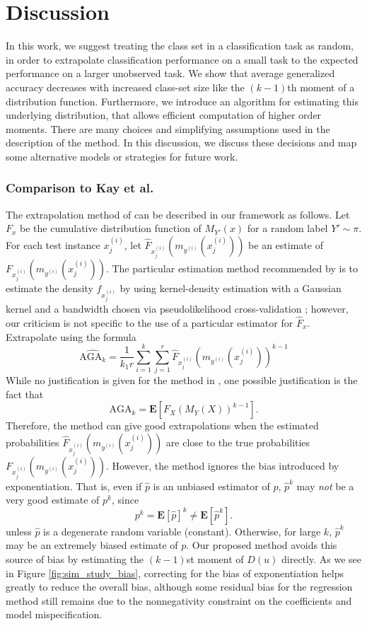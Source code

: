 \documentclass[twoside,11pt]{article}
\newcommand{\E}{\textbf{E}}
\begin{document}
\section{Discussion}
\label{sec:discussion}
In this work, we suggest treating the class set in a classification
task as random, in order to extrapolate classification performance on
a small task to the expected performance on a larger unobserved task.
We show that average generalized accuracy decreases with increased
class-set size like the $(k-1)$th moment of a distribution function.
Furthermore, we introduce an algorithm for estimating this underlying
distribution, that allows efficient computation of higher order
moments.  There are many choices and simplifying assumptions used in
the description of the method.  In this discussion, we discuss these
decisions and map some alternative models or strategies for future
work.


\subsubsection*{Comparison to Kay et al.}
The extrapolation method of \cite{Kay2008a} can be described in our
framework as follows.  Let $F_x$ be the cumulative distribution
function of $M_{Y'}(x)$ for a random label $Y' \sim \pi$.  For each
test instance $x^{(i)}_j$, let
$\hat{F}_{x^{(i)}_j}(m_{y^{(i)}}(x^{(i)}_j))$ be an estimate of
$F_{x^{(i)}_j}(m_{y^{(i)}}(x^{(i)}_j))$.  The particular estimation
method recommended by \cite{Kay2008a} is to estimate the density
$f_{x^{(i)}_j}$ by using kernel-density estimation with a Gaussian
kernel and a bandwidth chosen via pseudolikelihood cross-validation
\citep{cao1994comparative}; however, our criticism is not specific to
the use of a particular estimator for $\hat{F}_x$.  Extrapolate using
the formula
\[
\widehat{\text{AGA}_k} = \frac{1}{k_1 r} \sum_{i=1}^k \sum_{j=1}^r \hat{F}_{x^{(i)}_j}(m_{y^{(i)}}(x^{(i)}_j))^{k-1}
\]
While no justification is given for the method in \cite{Kay2008a},  one possible justification is the fact that
\[\text{AGA}_k = \E[F_X(M_{Y}(X))^{k-1}].\]
Therefore, the method can give good extrapolations when the estimated
probabilities $\hat{F}_{x^{(i)}_j}(m_{y^{(i)}}(x^{(i)}_j))$ are close
to the true probabilities $F_{x^{(i)}_j}(m_{y^{(i)}}(x^{(i)}_j))$.
However, the method ignores the bias introduced by exponentiation.
That is, even if $\hat{p}$ is an unbiased estimator of $p$, $\hat{p}^k$ may \emph{not} be a very good estimate of $p^k$, since
\[
p^k = \E[\hat{p}]^k \neq \E[\hat{p}^k].
\]
unless $\hat{p}$ is a degenerate random variable
(constant). Otherwise, for large $k$, $\hat{p}^k$ may be an extremely
biased estimate of $p$.  Our proposed method avoids this source of
bias by estimating the $(k-1)$st moment of $D(u)$ directly.  As we see
in Figure \ref{fig:sim_study_bias}, correcting for the bias of
exponentiation helps greatly to reduce the overall bias, although some
residual bias for the regression method still remains due to the
nonnegativity constraint on the coefficients and model
mispecification.
\end{document}
